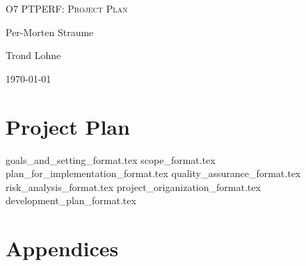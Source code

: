 \documentclass[hidelinks]{article}
\begin{document}

\begin{titlepage}
    \centering
    {\scshape\LARGE O7 PTPERF: Project Plan \par}
    \vspace{2cm}
    {Per-Morten Straume \par}
    {Trond Lohne \par}
    \vfill
    {\large \today\par}
\end{titlepage}

\pagebreak
\tableofcontents

\section*{Project Plan}
{goals_and_setting_format.tex}
{scope_format.tex}
{plan_for_implementation_format.tex}
{quality_assurance_format.tex}
{risk_analysis_format.tex}
{project_origanization_format.tex}
{development_plan_format.tex}

\pagebreak



\pagebreak
\section*{Appendices}
\end{document}
